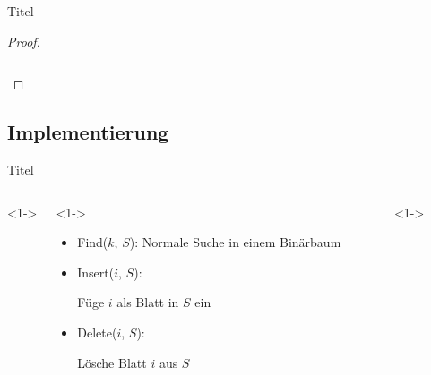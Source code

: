 \documentclass[t]{beamer}
\theoremstyle{plain}
\begin{document}
\begin{frame}{Titel}
{\begin{proof}
{\begin{columns}
\begin{column}[t]{0.35\textwidth}
        \end{column}
        \end{columns}}
    \end{proof}}
\end{frame}

\subsection{Implementierung}
\begin{frame}{Titel}
    \begin{columns}<1->
    \begin{column}{.65\textwidth}<1->
        \begin{itemize}
            \item<1> Find($k$, $S$): Normale Suche in einem Binärbaum
            \item<2> Insert($i$, $S$):
                \begin{algorithm}[H]
                    Füge $i$ als Blatt in $S$ ein \;
                \end{algorithm}
            \item<3> Delete($i$, $S$):
                \begin{algorithm}[H]
                    Lösche Blatt $i$ aus $S$ \;
                \end{algorithm}
        \end{itemize}
    \end{column}
    \begin{column}{.35\textwidth}<1->
        \raisebox{-\totalheight}{
        }
    \end{column}
    \end{columns}
\end{frame}
\end{document}
